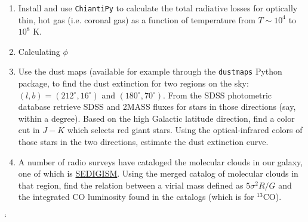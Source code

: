 \begin{enumerate}
\item Install and use {\tt ChiantiPy} to calculate the total radiative
losses for optically thin, hot gas (i.e. coronal gas) as a function of
temperature from $T \sim 10^4$ to $10^8$ K.
\item Calculating $\phi$
\item Use the \citet{schlegel98a} dust maps (available for example
through the {\tt dustmaps} Python package, to find the dust extinction
for two regions on the sky: $(l, b) = (212^\circ, 16^\circ)$ and
$(180^\circ, 70^\circ)$. From the SDSS photometric database retrieve
SDSS and 2MASS fluxes for stars in those directions
(say, within a degree). Based on the high Galactic
latitude direction, find a color cut in $J-K$ which selects red giant
stars. Using the optical-infrared colors of those stars in the two
directions, estimate the dust extinction curve.
\item A number of radio surveys have cataloged the molecular clouds in
our galaxy, one of which
is \href{https://sedigism.mpifr-bonn.mpg.de/cgi-bin-seg/SEDIGISM_DATABASE.cgi}{SEDIGISM}. Using
the merged catalog of molecular clouds in that region, find the
relation between a virial mass defined as $5 \sigma^2 R /G$ and the
integrated CO luminosity found in the catalogs (which is for
{}$^{13}$CO).
\end{enumerate}`


  
